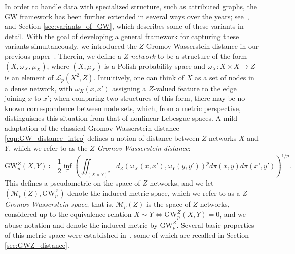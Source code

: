\documentclass{article}
\theoremstyle{definition}
\newcommand{\M}{\mathcal{M}}
\newcommand{\MZp}{\M_p(Z)}
\newcommand{\dgwz}{\mathrm{GW}_p^Z}
\newcommand{\Lp}{\mathcal{L}_p}
\begin{document}
In order to handle data with specialized structure, such as attributed graphs, the GW framework has been further extended in several ways over the years; see~\cite{Vayer2020FGW,Chowdhury2023HypergraphCOT,memoli2023ultrametric,kawano2024multi,yang2024exploiting}, and Section \ref{sec:variants_of_GW}, which describes some of these variants in detail. With the goal of developing a general framework for capturing these variants simultaneously, we introduced the $Z$-Gromov-Wasserstein distance in our previous paper~\cite{bauer2025zgromovwassersteindistance}. Therein, we define a \emph{$Z$-network} to be a structure of the form $(X,\omega_X,\mu_X)$, where $(X,\mu_X)$ is a Polish probability space and $\omega_X:X \times X \to Z$ is an element of $\Lp(X^2,Z)$. Intuitively, one can think of $X$ as a set of nodes in a dense network, with $\omega_X(x,x')$ assigning a $Z$-valued feature to the edge joining $x$ to $x'$; when comparing two structures of this form, there may be no known correspondence between node sets, which, from a metric perspective, distinguishes this situation from that of nonlinear Lebesgue spaces. A mild adaptation of the classical Gromov-Wasserstein distance \eqref{eqn:GW_distance_intro} defines a notion of distance between $Z$-networks $X$ and $Y$, which we refer to as the \emph{$Z$-Gromov-Wasserstein distance}:
\begin{equation}\label{eqn:ZGW_intro}
\dgwz(X,Y) \coloneqq \frac{1}{2} \inf_\pi \left(\iint_{(X \times Y)^2} d_Z(\omega_X(x,x'),\omega_Y(y,y'))^p d\pi(x,y)d\pi(x',y')\right)^{1/p}.
\end{equation}
This defines a pseudometric on the space of $Z$-networks, and we let $(\MZp,\dgwz)$ denote the induced metric space, which we refer to as a \emph{$Z$-Gromov-Wasserstein space}; that is, $\MZp$ is the space of $Z$-networks, considered up to the equivalence relation $X \sim Y \Leftrightarrow \dgwz(X,Y) = 0$, and we abuse notation and denote the induced metric by $\dgwz$. Several basic properties of this metric space were established in~\cite{bauer2025zgromovwassersteindistance}, some of which are recalled in Section \ref{sec:GWZ_distance}.
\end{document}
